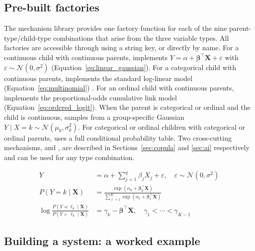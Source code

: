 \documentclass[article]{jss}
\begin{document}
\subsection{Pre-built factories}

The  mechanism library provides one factory function for each of
the nine parent-type/child-type combinations that arise from the three variable
types. All factories are accessible through  using a
string key, or directly by name. For a continuous child with continuous parents,
 implements
$Y = \alpha + \boldsymbol\beta^\top \mathbf{X} + \varepsilon$ with
$\varepsilon \sim \mathcal{N}(0, \sigma^2)$
(Equation~\ref{eq:linear_gaussian}).
For a categorical child with continuous parents, 
implements the standard log-linear model
(Equation~\ref{eq:multinomial}) \citep{agresti2002categorical}.
For an ordinal child with continuous parents,  implements the
proportional-odds cumulative link model \citep{mccullagh1980regression}
(Equation~\ref{eq:ordered_logit}).
When the parent is categorical or ordinal and the child is continuous,
 samples from a group-specific Gaussian
$Y \mid X = k \sim \mathcal{N}(\mu_k, \sigma_k^2)$.
For categorical or ordinal children with categorical or ordinal parents,
 uses a full conditional probability table. Two
cross-cutting mechanisms,  and ,
are described in Sections~\ref{sec:copula} and \ref{sec:ai} respectively and can
be used for any type combination.

\begin{align}
Y &= \alpha + \sum_{j=1}^q \beta_j X_j + \varepsilon, \quad
     \varepsilon \sim \mathcal{N}(0,\sigma^2) \label{eq:linear_gaussian} \\[4pt]
P(Y = k \mid \mathbf{X}) &= \frac{\exp(\alpha_k + \boldsymbol\beta_k^\top\mathbf{X})}
     {\sum_{\ell=1}^K \exp(\alpha_\ell + \boldsymbol\beta_\ell^\top\mathbf{X})}
     \label{eq:multinomial} \\[4pt]
\log\frac{P(Y \preceq \ell_k \mid \mathbf{X})}{P(Y \succ \ell_k \mid \mathbf{X})}
     &= \gamma_k - \boldsymbol\beta^\top\mathbf{X}, \quad
     \gamma_1 < \cdots < \gamma_{K-1} \label{eq:ordered_logit}
\end{align}

\subsection{Building a system: a worked example}
\end{document}
